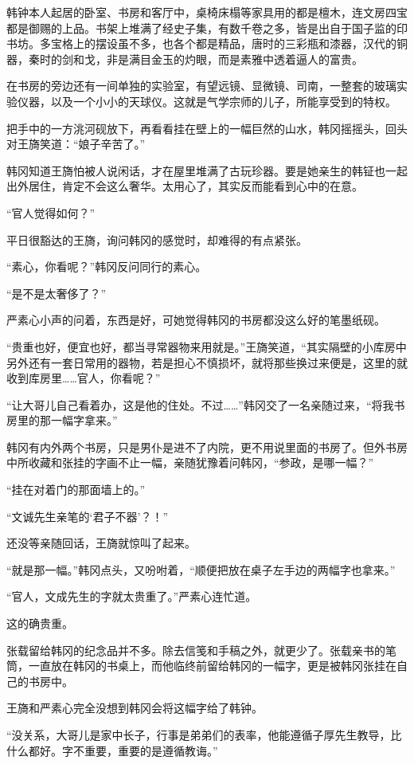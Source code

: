 韩钟本人起居的卧室、书房和客厅中，桌椅床榻等家具用的都是檀木，连文房四宝都是御赐的上品。书架上堆满了经史子集，有数千卷之多，皆是出自于国子监的印书坊。多宝格上的摆设虽不多，也各个都是精品，唐时的三彩瓶和漆器，汉代的铜器，秦时的剑和戈，非是满目金玉的灼眼，而是素雅中透着逼人的富贵。

在书房的旁边还有一间单独的实验室，有望远镜、显微镜、司南，一整套的玻璃实验仪器，以及一个小小的天球仪。这就是气学宗师的儿子，所能享受到的特权。

把手中的一方洮河砚放下，再看看挂在壁上的一幅巨然的山水，韩冈摇摇头，回头对王旖笑道：“娘子辛苦了。”

韩冈知道王旖怕被人说闲话，才在屋里堆满了古玩珍器。要是她亲生的韩钲也一起出外居住，肯定不会这么奢华。太用心了，其实反而能看到心中的在意。

“官人觉得如何？”

平日很豁达的王旖，询问韩冈的感觉时，却难得的有点紧张。

“素心，你看呢？”韩冈反问同行的素心。

“是不是太奢侈了？”

严素心小声的问着，东西是好，可她觉得韩冈的书房都没这么好的笔墨纸砚。

“贵重也好，便宜也好，都当寻常器物来用就是。”王旖笑道，“其实隔壁的小库房中另外还有一套日常用的器物，若是担心不慎损坏，就将那些换过来便是，这里的就收到库房里……官人，你看呢？”

“让大哥儿自己看着办，这是他的住处。不过……”韩冈交了一名亲随过来，“将我书房里的那一幅字拿来。”

韩冈有内外两个书房，只是男仆是进不了内院，更不用说里面的书房了。但外书房中所收藏和张挂的字画不止一幅，亲随犹豫着问韩冈，“参政，是哪一幅？”

“挂在对着门的那面墙上的。”

“文诚先生亲笔的‘君子不器’？！”

还没等亲随回话，王旖就惊叫了起来。

“就是那一幅。”韩冈点头，又吩咐着，“顺便把放在桌子左手边的两幅字也拿来。”

“官人，文成先生的字就太贵重了。”严素心连忙道。

这的确贵重。

张载留给韩冈的纪念品并不多。除去信笺和手稿之外，就更少了。张载亲书的笔筒，一直放在韩冈的书桌上，而他临终前留给韩冈的一幅字，更是被韩冈张挂在自己的书房中。

王旖和严素心完全没想到韩冈会将这幅字给了韩钟。

“没关系，大哥儿是家中长子，行事是弟弟们的表率，他能遵循子厚先生教导，比什么都好。字不重要，重要的是遵循教诲。”

